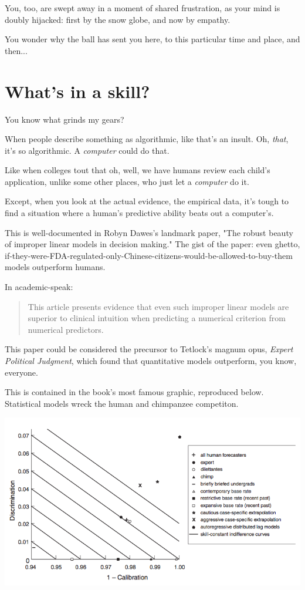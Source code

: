 You, too, are swept away in a moment of shared frustration, as your mind is
doubly hijacked: first by the snow globe, and now by empathy.

You wonder why the ball has sent you here, to this particular time and place,
and then...

\section{What's in a skill? }

You know what grinds my gears?

When people describe something as algorithmic, like that's an
insult. Oh, \textit{that}, it's so algorithmic. A \textit{computer} could do that.

Like when colleges tout that oh, well, we have humans review each child's
application, unlike some other places, who just let a \textit{computer} do
it.

Except, when you look at the actual evidence, the empirical data, it's tough to find a
situation where a human's predictive ability beats out a computer's.

This is well-documented in Robyn Dawes's landmark paper, "The robust beauty of
improper linear models in decision making." The gist of the paper: even ghetto,
if-they-were-FDA-regulated-only-Chinese-citizens-would-be-allowed-to-buy-them
models outperform humans.

In academic-speak:

\begin{quote}
This article presents evidence that even such improper linear models are
superior to clinical intuition when predicting a numerical criterion from
numerical predictors. 
\end{quote}

This paper could be considered the precursor to Tetlock's magnum opus, \textit{Expert
Political Judgment}, which found that quantitative models outperform, you know,
everyone.

This is contained in the book's most famous graphic, reproduced
below. Statistical models wreck the human and chimpanzee competiton.

\includegraphics[width=\textwidth]{graphics/expert-political-judgment}

